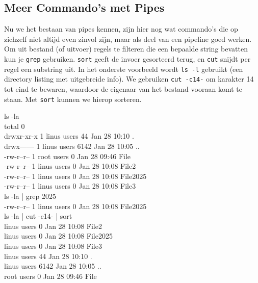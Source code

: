 \subsection{Meer Commando's met Pipes}\label{meer-commandos-met-pipes}

Nu we het bestaan van pipes kennen, zijn hier nog wat commando's die op zichzelf niet altijd even zinvol zijn, maar als deel van een pipeline goed werken. Om uit bestand (of uitvoer) regels te filteren die een bepaalde string bevatten kun je \texttt{grep} gebruiken. \texttt{sort} geeft de invoer gesorteerd terug, en \texttt{cut} snijdt per regel een substring uit. In het onderste voorbeeld wordt \texttt{ls\ -l} gebruikt (een directory listing met uitgebreide info). We gebruiken \texttt{cut\ -c14-} om karakter 14 tot eind te bewaren, waardoor de eigenaar van het bestand vooraan komt te staan. Met \texttt{sort} kunnen we hierop sorteren.

\begin{bash}
\userprompt[~/Folder] ls -la\\
total 0\\
drwxr-xr-x 1 linus users   44 Jan 28 10:10 .\\
drwx------ 1 linus users 6142 Jan 28 10:05 ..\\
-rw-r--r-- 1 root  users    0 Jan 28 09:46 File\\
-rw-r--r-- 1 linus users    0 Jan 28 10:08 File2\\
-rw-r--r-- 1 linus users    0 Jan 28 10:08 File2025\\
-rw-r--r-- 1 linus users    0 Jan 28 10:08 File3\\

\userprompt[~/Folder] ls -la | grep 2025\\
-rw-r--r-- 1 linus users 0 Jan 28 10:08 File2025\\

\userprompt[~/Folder] ls -la | cut -c14- | sort\\

linus users    0 Jan 28 10:08 File2\\
linus users    0 Jan 28 10:08 File2025\\
linus users    0 Jan 28 10:08 File3\\
linus users   44 Jan 28 10:10 .\\
linus users 6142 Jan 28 10:05 ..\\
root  users    0 Jan 28 09:46 File\\
\end{bash}

